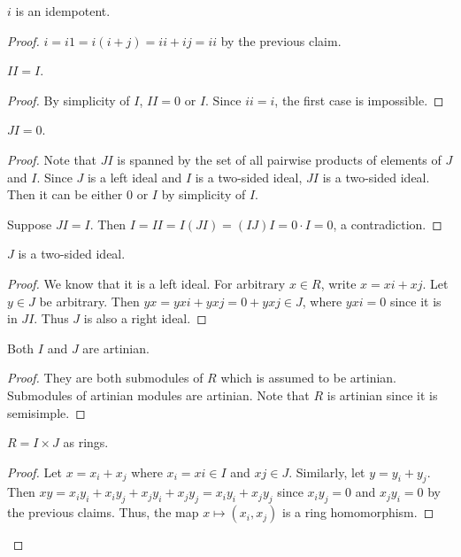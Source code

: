       \begin{claim}
        $i$ is an idempotent.
      \end{claim}
      \begin{proof}
        $i = i 1 = i(i + j) = i i + i j = i i$ by the previous claim.

      \begin{claim}
        $I I = I$.
      \end{claim}
      \begin{proof}
        By simplicity of $I$, $I I = 0$ or $I$. Since $ i i = i$, the first case is impossible.
      \end{proof}

      \begin{claim}
        $J I = 0$.
      \end{claim}
      \begin{proof}
        Note that $JI$ is spanned by the set of all pairwise products of elements of $J$ and $I$. Since $J$ is a left ideal and $I$ is a two-sided ideal, $JI$ is a two-sided ideal. Then it can be either $0$ or $I$ by simplicity of $I$. 

        Suppose $JI = I$. Then $I = I I = I (J I) = (I J) I = 0 \cdot I = 0$, a contradiction.
      \end{proof}

      \begin{claim}
        $J$ is a two-sided ideal.
      \end{claim}
      \begin{proof}
        We know that it is a left ideal. For arbitrary $x \in R$, write $x = x i + x j$. Let $y \in J$ be arbitrary. Then $y x = y x i + y x j = 0 + y x j \in J$, where $y x i = 0$ since it is in $J I$. Thus $J$ is also a right ideal.
      \end{proof}

      \begin{claim}
        Both $I$ and $J$ are artinian.
      \end{claim}
      \begin{proof}
        They are both submodules of $R$ which is assumed to be artinian. Submodules of artinian modules are artinian. Note that $R$ is artinian since it is semisimple.
      \end{proof}

      \begin{claim}
        $ R = I \times J$ as rings.
      \end{claim}
      \begin{proof}
        Let $x = x_i + x_j$ where $x_i = x i \in I$ and $x j \in J$. Similarly, let $y = y_i + y_j$. Then $x y = x_i y_i + x_i y_j + x_j y_i + x_j y_j = x_i y_i + x_j y_j$ since $x_i y_j = 0$ and $x_j y_i = 0$ by the previous claims. Thus, the map $x \mapsto (x_i, x_j)$ is a ring homomorphism.


\end{proof}
\end{proof}

